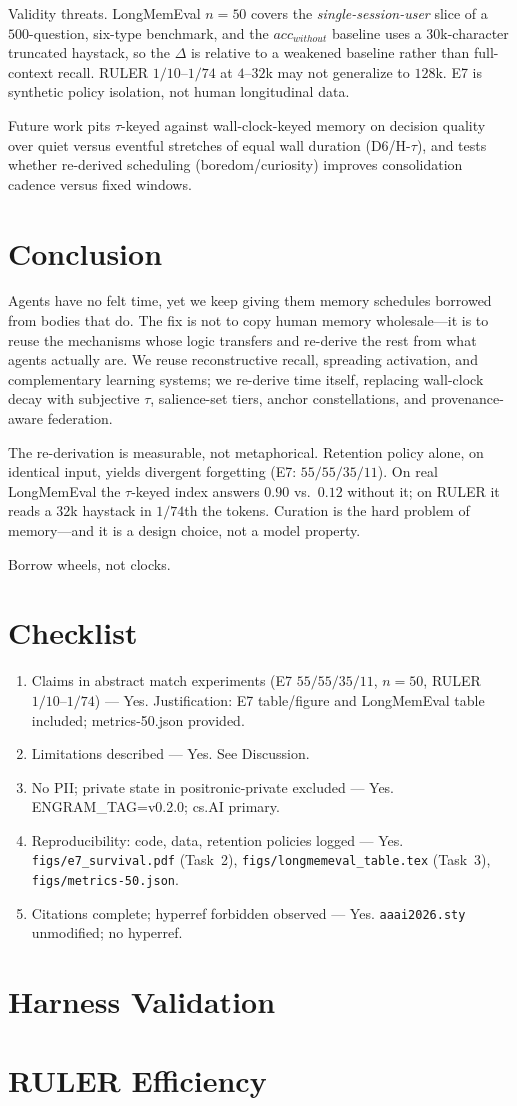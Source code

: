 \documentclass[letterpaper]{article}
\begin{document}
Validity threats. LongMemEval $n{=}50$ covers the \emph{single-session-user} slice of a $500$-question, six-type benchmark, and the $acc_{without}$ baseline uses a $30$k-character truncated haystack, so the $\Delta$ is relative to a weakened baseline rather than full-context recall. RULER $1/10$--$1/74$ at $4$--$32$k may not generalize to $128$k. E7 is synthetic policy isolation, not human longitudinal data.

Future work pits $\tau$-keyed against wall-clock-keyed memory on decision quality over quiet versus eventful stretches of equal wall duration (D6/H-$\tau$), and tests whether re-derived scheduling (boredom/curiosity) improves consolidation cadence versus fixed windows.

\section{Conclusion}
Agents have no felt time, yet we keep giving them memory schedules borrowed from bodies that do. The fix is not to copy human memory wholesale---it is to reuse the mechanisms whose logic transfers and re-derive the rest from what agents actually are. We reuse reconstructive recall, spreading activation, and complementary learning systems; we re-derive time itself, replacing wall-clock decay with subjective $\tau$, salience-set tiers, anchor constellations, and provenance-aware federation.

The re-derivation is measurable, not metaphorical. Retention policy alone, on identical input, yields divergent forgetting (E7: $55/55/35/11$). On real LongMemEval the $\tau$-keyed index answers $0.90$ vs.\ $0.12$ without it; on RULER it reads a $32$k haystack in $1/74$th the tokens. Curation is the hard problem of memory---and it is a design choice, not a model property.

Borrow wheels, not clocks.



\section*{Checklist}
\begin{enumerate}
\item Claims in abstract match experiments (E7 $55/55/35/11$, $n{=}50$, RULER $1/10$--$1/74$) --- Yes. Justification: E7 table/figure and LongMemEval table included; metrics-50.json provided.
\item Limitations described --- Yes. See Discussion.
\item No PII; private state in positronic-private excluded --- Yes. ENGRAM\_TAG=v0.2.0; cs.AI primary.
\item Reproducibility: code, data, retention policies logged --- Yes. \texttt{figs/e7\_survival.pdf} (Task~2), \texttt{figs/longmemeval\_table.tex} (Task~3), \texttt{figs/metrics-50.json}.
\item Citations complete; hyperref forbidden observed --- Yes. \texttt{aaai2026.sty} unmodified; no hyperref.
\end{enumerate}

\appendix
\section{Harness Validation}\label{app:harness}

\section{RULER Efficiency}\label{app:ruler}

\end{document}
